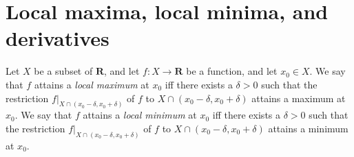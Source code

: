 \section{Local maxima, local minima, and derivatives}\label{sec 10.2}

\begin{definition}\label{10.2.1}
    Let \(X\) be a subset of \(\mathbf{R}\), and let \(f : X \to \mathbf{R}\) be a function, and let \(x_0 \in X\).
    We say that \(f\) attains a \emph{local maximum} at \(x_0\) iff there exists a \(\delta > 0\) such that the restriction \(f|_{X \cap (x_0 - \delta, x_0 + \delta)}\) of \(f\) to \(X \cap (x_0 - \delta, x_0 + \delta)\) attains a maximum at \(x_0\).
    We say that \(f\) attains a \emph{local minimum} at \(x_0\) iff there exists a \(\delta > 0\) such that the restriction \(f|_{X \cap (x_0 - \delta, x_0 + \delta)}\) of \(f\) to \(X \cap (x_0 - \delta, x_0 + \delta)\) attains a minimum at \(x_0\).
\end{definition}